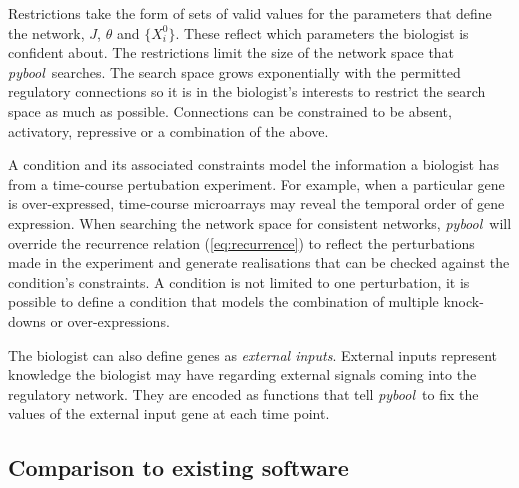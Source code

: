 \documentclass{article}
\newcommand{\pybool}{\emph{pybool}}
\begin{document}
Restrictions take the form of sets of valid values for the parameters that define the network,  $J$, $\theta$ and $\{X_i^0\}$. These reflect which parameters the biologist is confident about. The restrictions limit the size of the network space that \pybool\ searches. The search space grows exponentially with the permitted regulatory connections so it is in the biologist's interests to restrict the search space as much as possible. Connections can be constrained to be absent, activatory, repressive or a combination of the above.

A condition and its associated constraints model the information a biologist has from a time-course pertubation experiment. For example, when a particular gene is over-expressed, time-course microarrays may reveal the temporal order of gene expression. When searching the network space for consistent networks, \pybool\ will override the recurrence relation (\ref{eq:recurrence}) to reflect the perturbations made in the experiment and generate realisations that can be checked against the condition's constraints. A condition is not limited to one perturbation, it is possible to define a condition that models the combination of multiple knock-downs or over-expressions.

The biologist can also define genes as \emph{external inputs}. External inputs represent knowledge the biologist may have regarding external signals coming into the regulatory network. They are encoded as functions that tell \pybool\ to fix the values of the external input gene at each time point.





\subsection{Comparison to existing software}
\end{document}
